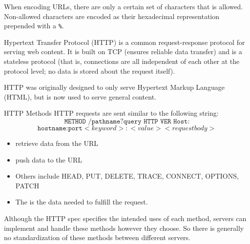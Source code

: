 When encoding URLs, there are only a certain set of characters that is allowed. Non-allowed characters are encoded as their hexadecimal representation prepended with a \texttt{\%}.

\begin{dfnbox}{Hypertext Transfer Protocol (HTTP)}{}
     is a common request-response protocol for serving web content. It is built on TCP (ensures reliable data transfer) and is a stateless protocol (that is, connections are all independent of each other at the protocol level; no data is stored about the request itself).
\end{dfnbox}

HTTP was originally designed to only serve Hypertext Markup Language (HTML), but is now used to serve general content.

\begin{dfnbox}{HTTP Methods}{}
    HTTP requests are sent similar to the following string:
    \[ \texttt{METHOD /pathname?query HTTP VER Host:} \] \[ \texttt{hostname:port} <keyword>:<value> <request body> \]
    \begin{itemize}[noitemsep]
        \item {} retrieve data from the URL
        \item {} push data to the URL
        \item Others include HEAD, PUT, DELETE, TRACE, CONNECT, OPTIONS, PATCH
        \item The  is the data needed to fulfill the request.
    \end{itemize}
\end{dfnbox}

Although the HTTP spec specifies the intended uses of each method, servers can implement and handle these methods however they choose. So there is generally no standardization of these methods between different servers.

